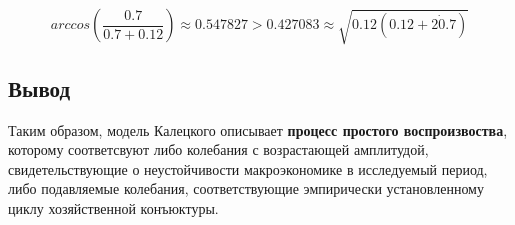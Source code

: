 \begin{equation}\label{eq:Kalecki-stab}
arccos \left( \frac{0.7}{0.7 + 0.12} \right) \approx 0.547827 > 0.427083 \approx \sqrt{0.12 (0.12 + 2 \dot 0.7)}
\end{equation}

\subsection{Вывод}

Таким образом, модель Калецкого описывает \textbf{процесс простого воспроизвоства}, которому соответсвуют либо колебания с возрастающей амплитудой, свидетельствующие о неустойчивости макроэкономике в исследуемый период, либо подавляемые колебания, соответствующие эмпирически установленному циклу хозяйственной конъюктуры.
